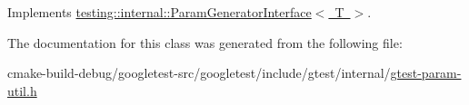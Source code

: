 Implements \mbox{\hyperlink{classtesting_1_1internal_1_1ParamGeneratorInterface_afa7211b74990e11d3fc7ad4e7113da4f}{testing\+::internal\+::\+Param\+Generator\+Interface$<$ T $>$}}.



The documentation for this class was generated from the following file\+:\begin{DoxyCompactItemize}
\item 
cmake-\/build-\/debug/googletest-\/src/googletest/include/gtest/internal/\mbox{\hyperlink{gtest-param-util_8h}{gtest-\/param-\/util.\+h}}\end{DoxyCompactItemize}
